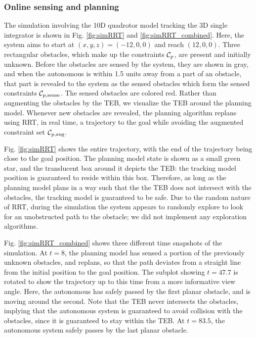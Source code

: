 \subsubsection{Online sensing and planning}
The simulation involving the 10D quadrotor model tracking the 3D single integrator is shown in Fig. \ref{fig:simRRT} and \ref{fig:simRRT_combined}.
Here, the system aims to start at $(x,y,z) = (-12, 0, 0)$ and reach $(12, 0, 0)$. 
Three rectangular obstacles, which make up the constraints $\mathcal C_p$, are present and initially unknown.
Before the obstacles are sensed by the system, they are shown in gray, and when the autonomous is within 1.5 units away from a part of an obstacle, that part is revealed to the system as the sensed obstacles which form the sensed constraints $\mathcal C_{p,\text{sense}}$.
The sensed obstacles are colored red.
Rather than augmenting the obstacles by the TEB, we visualize the TEB around the planning model.
Whenever new obstacles are revealed, the planning algorithm replans using RRT, in real time, a trajectory to the goal while avoiding the augmented constraint set $\mathcal C_{p,\text{aug}}$.

Fig. \ref{fig:simRRT} shows the entire trajectory, with the end of the trajectory being close to the goal position.
The planning model state is shown as a small green star, and the translucent box around it depicts the TEB: the tracking model position is guaranteed to reside within this box.
Therefore, as long as the planning model plans in a way such that the the TEB does not intersect with the obstacles, the tracking model is guaranteed to be safe.
Due to the random nature of RRT, during the simulation the system appears to randomly explore to look for an unobstructed path to the obstacle; we did not implement any exploration algorithms.

Fig. \ref{fig:simRRT_combined} shows three different time snapshots of the simulation.
At $t=8$, the planning model has sensed a portion of the previously unknown obstacles, and replans, so that the path deviates from a straight line from the initial position to the goal position.
The subplot showing $t = 47.7$ is rotated to show the trajectory up to this time from a more informative view angle.
Here, the autonomous has safely passed by the first planar obstacle, and is moving around the second. 
Note that the TEB never intersects the obstacles, implying that the autonomous system is guaranteed to avoid collision with the obstacles, since it is guaranteed to stay within the TEB.
At $t=83.5$, the autonomous system safely passes by the last planar obstacle.

